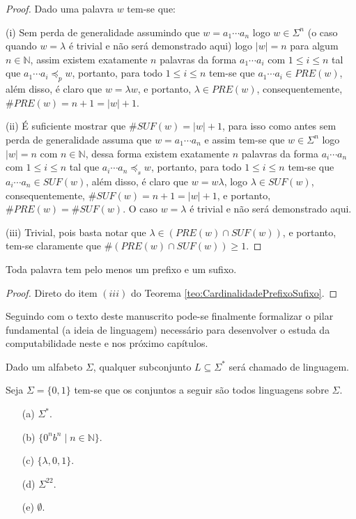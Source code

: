 \begin{proof}
	Dado uma palavra $w$ tem-se que:
	\item[(i)] Sem perda de generalidade assumindo que $w = a_1\cdots a_n$ logo $w \in \Sigma^n$ (o caso quando $w = \lambda$ é trivial e não será demonstrado aqui) logo $|w| = n$ para algum $n \in \mathbb{N}$, assim existem exatamente $n$ palavras da forma $a_1 \cdots a_i$ com $1 \leq i \leq n$ tal que $a_1 \cdots a_i \preceq_p w$, portanto, para todo $1 \leq i \leq n$ tem-se que $a_1 \cdots a_i \in PRE(w)$, além disso, é claro que $w = \lambda w$, e portanto, $\lambda \in PRE(w)$, consequentemente, $\#PRE(w) = n + 1 = |w| + 1$.
	\item[(ii)] É suficiente mostrar que $\# SUF(w) = |w| + 1$, para isso como antes sem perda de generalidade assuma que $w = a_1\cdots a_n$ e assim tem-se que $w \in \Sigma^n$ logo $|w| = n$ com $n \in \mathbb{N}$, dessa forma existem exatamente $n$ palavras da forma $a_i \cdots a_n$ com $1 \leq i \leq n$ tal que $a_i \cdots a_n \preceq_s w$, portanto, para todo $1 \leq i \leq n$ tem-se que $a_i \cdots a_n \in SUF(w)$, além disso, é claro que $w = w\lambda$, logo $\lambda \in SUF(w)$, consequentemente, $\#SUF(w) = n + 1 = |w| + 1$, e portanto, $\#PRE(w) = \#SUF(w)$. O caso $w = \lambda$ é trivial e não será demonstrado aqui.
	\item[(iii)] Trivial, pois basta notar que $\lambda \in (PRE(w) \cap SUF(w))$, e portanto, tem-se claramente que $\#(PRE(w) \cap SUF(w)) \geq 1$.
\end{proof}

\begin{corolario}
	Toda palavra tem pelo menos um prefixo e um sufixo.	
\end{corolario}

\begin{proof}
	Direto do item $(iii)$ do Teorema \ref{teo:CardinalidadePrefixoSufixo}.
\end{proof}

Seguindo com o texto deste manuscrito pode-se finalmente formalizar o pilar fundamental (a ideia de linguagem) necessário para desenvolver o estuda da computabilidade neste e nos próximo capítulos.

\begin{definicao}[Linguagem]\label{def:Linguagem}
	Dado um alfabeto $\Sigma$, qualquer subconjunto $L \subseteq \Sigma^*$ será chamado de linguagem.
\end{definicao}

\begin{exemplo}
	Seja $\Sigma = \{0, 1\}$ tem-se que os conjuntos a seguir são todos linguagens sobre $\Sigma$.
	\begin{itemize}
		\item[(a)] $\Sigma^*$.
		\item[(b)] $\{0^nb^n \mid n \in \mathbb{N}\}$.
		\item[(c)] $\{\lambda, 0, 1\}$.
		\item[(d)] $\Sigma^{22}$.
		\item[(e)] $\emptyset$.
	\end{itemize}
\end{exemplo}


